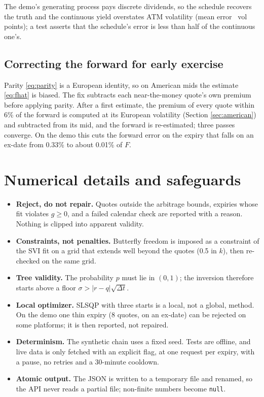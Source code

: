 \documentclass[11pt]{article}
\begin{document}
The demo's generating process pays discrete dividends, so the schedule recovers
the truth and the continuous yield overstates ATM volatility (mean error
\atmErrContinuous\ vol points); a test asserts that the schedule's error is less
than half of the continuous one's.

\subsection{Correcting the forward for early exercise}\label{sec:fcorr}

Parity \eqref{eq:parity} is a European identity, so on American mids the estimate
\eqref{eq:fhat} is biased. The fix subtracts each near-the-money quote's own
premium before applying parity. After a first estimate, the premium of every quote
within 6\% of the forward is computed at its European volatility (Section
\ref{sec:american}) and subtracted from its mid, and the forward is re-estimated;
three passes converge. On the demo this cuts the forward error on the expiry that
falls on an ex-date from 0.33\% to about 0.01\% of $F$.

\section{Numerical details and safeguards}\label{sec:numerics}

\begin{itemize}
  \item \textbf{Reject, do not repair.} Quotes outside the arbitrage bounds,
        expiries whose fit violates $g\ge0$, and a failed calendar check are
        reported with a reason. Nothing is clipped into apparent validity.
  \item \textbf{Constraints, not penalties.} Butterfly freedom is imposed as a
        constraint of the SVI fit on a grid that extends well beyond the quotes
        (0.5 in $k$), then re-checked on the same grid.
  \item \textbf{Tree validity.} The probability $p$ must lie in $(0,1)$; the
        inversion therefore starts above a floor $\sigma>|r-q|\sqrt{\Delta t}$.
  \item \textbf{Local optimizer.} SLSQP with three starts is a local, not a global,
        method. On the demo one thin expiry (8 quotes, on an ex-date) can be
        rejected on some platforms; it is then reported, not repaired.
  \item \textbf{Determinism.} The synthetic chain uses a fixed seed. Tests are
        offline, and live data is only fetched with an explicit flag, at one
        request per expiry, with a pause, no retries and a 30-minute cooldown.
  \item \textbf{Atomic output.} The JSON is written to a temporary file and
        renamed, so the API never reads a partial file; non-finite numbers become
        \texttt{null}.
\end{itemize}
\end{document}

